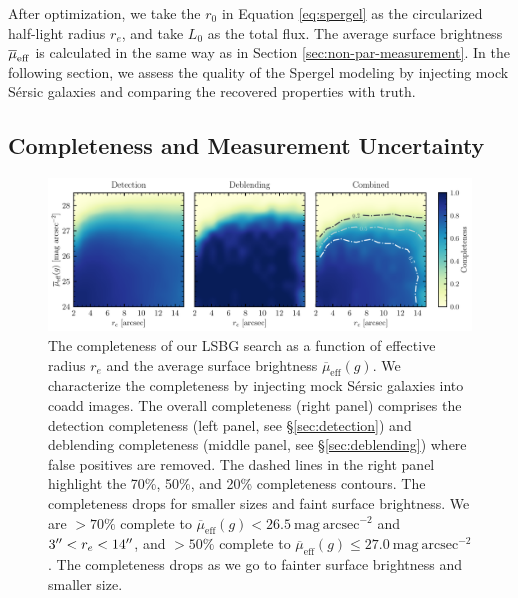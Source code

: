\documentclass[twocolumn,astrosymb,twocolappendix]{aastex631}
\newcommand{\sbunit}{\mathrm{mag\ arcsec}^{-2}}
\newcommand{\sbeff}{\overline{\mu}_{\mathrm{eff}}(g)}
\newcommand{\jiaxuan}[1]{\textcolor{orange}{\textbf{Jiaxuan: #1}}}
\newcommand{\sersic}{S\'ersic}
\begin{document}
\begin{CJK*}{UTF8}{gbsn}
After optimization, we take the $r_0$ in Equation \eqref{eq:spergel} as the circularized half-light radius $r_e$, and take $L_0$ as the total flux. The average surface brightness $\overline{\mu}_{\rm eff}$ is calculated in the same way as in Section \ref{sec:non-par-measurement}. In the following section, we assess the quality of the Spergel modeling by injecting mock \sersic{} galaxies and comparing the recovered properties with truth. 


\subsection{Completeness and Measurement Uncertainty}\label{sec:comp_meas}
\begin{figure}
	\vbox{ 
		\centering
		\includegraphics[width=1\linewidth]{completeness.pdf}
	}
	\caption{The completeness of our LSBG search as a function of effective radius $r_e$ and the average surface brightness $\sbeff$. We characterize the completeness by injecting mock \sersic{} galaxies into coadd images. The overall completeness (right panel) comprises the detection completeness (left panel, see \S \ref{sec:detection}) and deblending completeness (middle panel, see \S \ref{sec:deblending}) where false positives are removed. The dashed lines in the right panel highlight the 70\%, 50\%, and 20\% completeness contours. The completeness drops for smaller sizes and faint surface brightness. We are $>70\%$ complete to $\sbeff < 26.5\ \sbunit$ and $3\mbox{$^{\prime\prime}$} < r_e < 14\mbox{$^{\prime\prime}$}$, and $>50\%$ complete to $\sbeff \leqslant 27.0\ \sbunit$. The completeness drops as we go to fainter surface brightness and smaller size. 
	}
	\label{fig:completeness}
\end{figure}


\end{CJK*}
\end{document}
